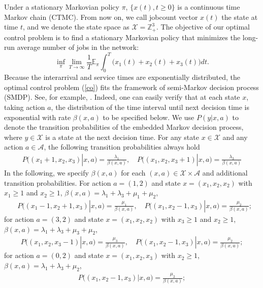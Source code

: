 \documentclass[11pt]{article}
\newcommand{\Z}{\mathbb{Z}}
\newcommand{\E}{\mathbb{E}}
\newcommand{\X}{\mathcal{X}}
\newcommand{\A}{\mathcal{A}}
\theoremstyle{definition}
\numberwithin{equation}{section}
\begin{document}
Under a stationary Markovian policy $\pi$, $\{x(t), t\ge 0 \}$ is a
continuous time Markov chain (CTMC). From now on, we call jobcount
vector $x(t)$ the state at time $t$, and we denote the state space as
$\X = \Z^3_+$.  The objective of our optimal control problem is to find
a stationary Markovian policy that minimizes the long-run average
number of jobs in the network:
\begin{equation}\label{co}
\inf_{\pi} \lim_{T\rightarrow \infty} \frac{1}{T} {\E}_\pi \int_0^T\Big(x_1(t)+x_2(t)+x_3(t)\Big)dt.
\end{equation}
 Because the interarrival and service times are exponentially
  distributed, the optimal control problem (\ref{co}) fits the
  framework of semi-Markov decision process (SMDP). See, for example,
  \cite[Chapter 11]{Puterman2005}.  Indeed, one can easily verify that
   at each state $x$, taking action $a$, the distribution of the
  time interval until next decision time is exponential with rate
  $\beta(x,a)$ to be specified below. We use $P(y|x,a)$ to denote the
  transition probabilities of the embedded Markov decision process,
  where $y\in \X$ is a state at the next decision time. For any
  state $x\in \X$ and any action $a\in \A$, the following transition
  probabilities always hold
\begin{align}
   P\big((x_1+1, x_2, x_3)|x, a\big)=\frac{\lambda_1}{\beta(x,a)}, \quad
   P\big((x_1, x_2, x_3+1)|x,a \big)=\frac{\lambda_3}{\beta(x,a)} \label{eq:arrivals}
\end{align}
In the following, we specify $\beta(x,a)$ for each $(x,a)\in \X\times \A$ and additional
transition probabilities.  For action $a=(1,2)$ and state
$x=(x_1, x_2, x_2)$ with $x_1\ge 1$ and $x_2\ge 1$,
$\beta(x,a)=\lambda_1+\lambda_3+\mu_1+\mu_2$,
\begin{align*}
  &  P\big((x_1-1, x_2+1, x_3)|x,a \big)=\frac{\mu_1}{\beta(x,a)}, \quad
    P\big((x_1, x_2-1, x_3)|x,a\big)=\frac{\mu_2}{\beta(x,a)};
\end{align*}
for action $a=(3,2)$ and state $x=(x_1, x_2, x_2)$ with $x_3\ge 1$ and
$x_2\ge 1$, $\beta(x,a)=\lambda_1+\lambda_3+\mu_3+\mu_2$,
\begin{align*}
    P\big((x_1, x_2, x_3-1)|x,a \big)=\frac{\mu_3}{\beta(x,a)}, \quad
    P\big((x_1, x_2-1, x_3)|x,a\big)=\frac{\mu_2}{\beta(x,a)};
\end{align*}
for action $a=(0,2)$ and state $x=(x_1,x_2, x_3)$ with $x_2\ge 1$, $\beta(x,a)=\lambda_1+\lambda_3+\mu_2$,
\begin{align*}
    P\big((x_1, x_2-1, x_3)|x,a\big)=\frac{\mu_2}{\beta(x,a)};
\end{align*}
\end{document}
